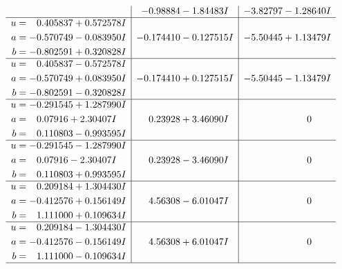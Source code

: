 \documentclass[1p]{elsarticle_modified}
\theoremstyle{definition}
\begin{document}
$$\begin{array}{c|c|c}
 & -0.98884 - 1.84483 I & -3.82797 - 1.28640 I \\ \hline\begin{aligned}
u &= \phantom{-}0.405837 + 0.572578 I \\
a &= -0.570749 - 0.083950 I \\
b &= -0.802591 + 0.320828 I\end{aligned}
 & -0.174410 - 0.127515 I & -5.50445 + 1.13479 I \\ \hline\begin{aligned}
u &= \phantom{-}0.405837 - 0.572578 I \\
a &= -0.570749 + 0.083950 I \\
b &= -0.802591 - 0.320828 I\end{aligned}
 & -0.174410 + 0.127515 I & -5.50445 - 1.13479 I \\ \hline\begin{aligned}
u &= -0.291545 + 1.287990 I \\
a &= \phantom{-}0.07916 + 2.30407 I \\
b &= \phantom{-}0.110803 - 0.993595 I\end{aligned}
 & \phantom{-}0.23928 + 3.46090 I & \phantom{-0.000000 } 0 \\ \hline\begin{aligned}
u &= -0.291545 - 1.287990 I \\
a &= \phantom{-}0.07916 - 2.30407 I \\
b &= \phantom{-}0.110803 + 0.993595 I\end{aligned}
 & \phantom{-}0.23928 - 3.46090 I & \phantom{-0.000000 } 0 \\ \hline\begin{aligned}
u &= \phantom{-}0.209184 + 1.304430 I \\
a &= -0.412576 + 0.156149 I \\
b &= \phantom{-}1.111000 + 0.109634 I\end{aligned}
 & \phantom{-}4.56308 - 6.01047 I & \phantom{-0.000000 } 0 \\ \hline\begin{aligned}
u &= \phantom{-}0.209184 - 1.304430 I \\
a &= -0.412576 - 0.156149 I \\
b &= \phantom{-}1.111000 - 0.109634 I\end{aligned}
 & \phantom{-}4.56308 + 6.01047 I & \phantom{-0.000000 } 0\\
 \hline 
 \end{array}$$\newpage$$\begin{array}{c|c|c}  

\end{array}$$
\end{document}
